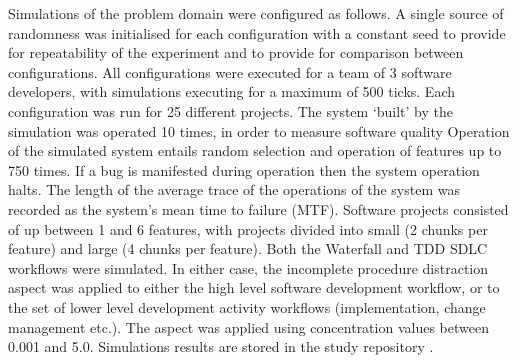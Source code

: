 \documentclass{llncs}
\begin{document}
Simulations of the problem domain were configured as follows.  A single source of randomness was initialised for each
configuration with a constant seed to provide for repeatability of the experiment and to provide for comparison between
configurations. All configurations were executed for a team of 3 software developers, with simulations executing for a
maximum of 500 ticks.  Each configuration was run for 25 different projects.  The system `built' by the simulation was
operated 10 times, in order to measure software quality Operation of the simulated system entails random selection and
operation of features up to 750 times.  If a bug is manifested during operation then the system operation halts.  The
length of the average trace of the operations of the system was recorded as the system's mean time to failure
(MTF). Software projects consisted of up between 1 and 6 features, with projects divided into small (2 chunks per
feature) and large (4 chunks per feature). Both the Waterfall and TDD SDLC workflows were simulated.  In either case,
the incomplete procedure distraction aspect was applied to either the high level software development workflow, or to
the set of lower level development activity workflows (implementation, change management etc.).  The aspect was applied
using concentration values between 0.001 and 5.0.  Simulations results are stored in the study repository
\citep{storer2016softdev-workflow-scm}.
\end{document}
